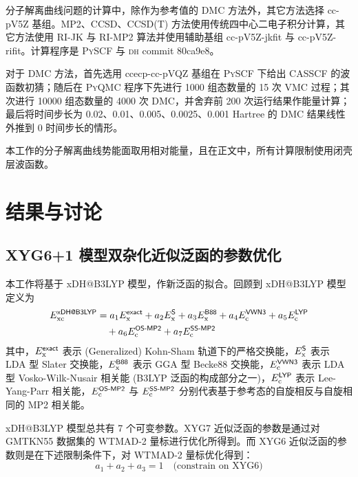 分子解离曲线问题的计算中，除作为参考值的 DMC 方法外，其它方法选择 cc-pV5Z 基组。MP2、CCSD、CCSD(T) 方法使用传统四中心二电子积分计算，其它方法使用 RI-JK 与 RI-MP2 算法并使用辅助基组 cc-pV5Z-jkfit 与 cc-pV5Z-rifit。计算程序是 \textsc{PySCF} 与 \textsc{dh} commit 80ca9e8。

对于 DMC 方法，首先选用 ccecp-cc-pVQZ 基组在 \textsc{PySCF} 下给出 CASSCF 的波函数初猜；随后在 \textsc{PyQMC} 程序下先进行 1000 组态数量的 15 次 VMC 过程；其次进行 10000 组态数量的 4000 次 DMC，并舍弃前 200 次运行结果作能量计算；最后将时间步长为 0.02、0.01、0.005、0.0025、0.001 Hartree 的 DMC 结果线性外推到 0 时间步长的情形。

本工作的分子解离曲线势能面取用相对能量，且在正文中，所有计算限制使用闭壳层波函数。

\section{结果与讨论}
\label{sec.2.iepa-results}

\subsection{XYG6+1 模型双杂化近似泛函的参数优化}

本工作将基于 xDH@B3LYP 模型\cite{Zhang-Xu.JPCL.2021}，作新泛函的拟合。回顾到 xDH@B3LYP 模型定义为
\begin{align}
  E_\mathrm{xc}^{\textsf{xDH@B3LYP}} &= a_1 E_\mathrm{x}^{\textsf{exact}} + a_2 E_\mathrm{x}^{\textsf{S}} + a_3 E_\mathrm{x}^{\textsf{B88}} + a_4 E_\mathrm{c}^{\textsf{VWN3}} + a_5 E_\mathrm{c}^{\textsf{LYP}} \notag \\
  &\quad + a_6 E_\mathrm{c}^{\textsf{OS-MP2}} + a_7 E_\mathrm{c}^{\textsf{SS-MP2}}
\end{align}
其中，$E_\mathrm{x}^{\textsf{exact}}$ 表示 (Generalized) Kohn-Sham 轨道下的严格交换能，$E_\mathrm{x}^{\textsf{S}}$ 表示 LDA 型 Slater 交换能\cite{Bloch-Bloch.ZP.1929,Dirac-Dirac.MPCPS.1930}，$E_\mathrm{x}^{\textsf{B88}}$ 表示 GGA 型 Becke88 交换能\cite{Becke-Becke.PRA.1988}，$E_\mathrm{c}^{\textsf{VWN3}}$ 表示 LDA 型 Vosko-Wilk-Nusair 相关能\cite{Vosko-Nusair.CJP.1980} (B3LYP 泛函的构成部分之一\cite{Becke-Becke.JCP.1993,Stephens-Frisch.JPC.1994})，$E_\mathrm{c}^{\textsf{LYP}}$ 表示 Lee-Yang-Parr 相关能\cite{Lee-Parr.PRB.1988}，$E_\mathrm{c}^{\textsf{OS-MP2}}$ 与 $E_\mathrm{c}^{\textsf{SS-MP2}}$ 分别代表基于参考态的自旋相反与自旋相同的 MP2 相关能。

xDH@B3LYP 模型总共有 7 个可变参数。XYG7 近似泛函的参数是通过对 GMTKN55 数据集的 WTMAD-2 量标进行优化所得到。而 XYG6 近似泛函的参数则是在下述限制条件下，对 WTMAD-2 量标优化得到：
\begin{equation}
  \label{eq.2.constrain-xyg6}
  a_1 + a_2 + a_3 = 1 \quad \text{(constrain on XYG6)}
\end{equation}

